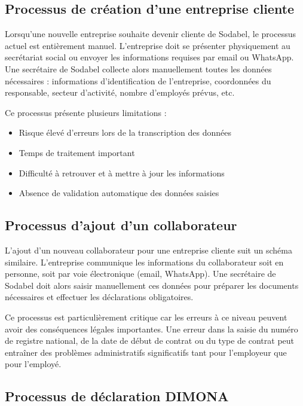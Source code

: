 \subsection{Processus de création d'une entreprise cliente}

Lorsqu'une nouvelle entreprise souhaite devenir cliente de Sodabel, le processus actuel est entièrement manuel. L'entreprise doit se présenter physiquement au secrétariat social ou envoyer les informations requises par email ou WhatsApp. Une secrétaire de Sodabel collecte alors manuellement toutes les données nécessaires : informations d'identification de l'entreprise, coordonnées du responsable, secteur d'activité, nombre d'employés prévus, etc.

\noindent Ce processus présente plusieurs limitations :
\begin{itemize}[leftmargin=*,label=\textcolor{darkgray}{$\bullet$},itemsep=0.3em]
  \item Risque élevé d'erreurs lors de la transcription des données
  \item Temps de traitement important
  \item Difficulté à retrouver et à mettre à jour les informations
  \item Absence de validation automatique des données saisies
\end{itemize}

\subsection{Processus d'ajout d'un collaborateur}

L'ajout d'un nouveau collaborateur pour une entreprise cliente suit un schéma similaire. L'entreprise communique les informations du collaborateur soit en personne, soit par voie électronique (email, WhatsApp). Une secrétaire de Sodabel doit alors saisir manuellement ces données pour préparer les documents nécessaires et effectuer les déclarations obligatoires.

\begin{note}
Ce processus est particulièrement critique car les erreurs à ce niveau peuvent avoir des conséquences légales importantes. Une erreur dans la saisie du numéro de registre national, de la date de début de contrat ou du type de contrat peut entraîner des problèmes administratifs significatifs tant pour l'employeur que pour l'employé.
\end{note}

\subsection{Processus de déclaration DIMONA}

